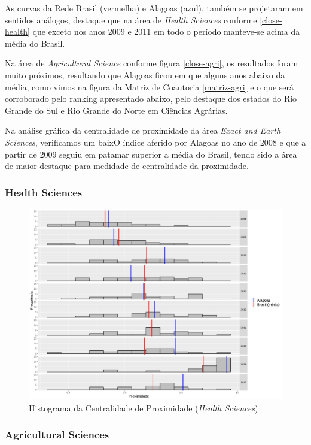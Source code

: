 As curvas da Rede Brasil (vermelha) e Alagoas (azul), também se projetaram em sentidos análogos, destaque que na área de \textit{Health Sciences} conforme \ref{close-health} que exceto nos anos 2009 e 2011 em todo o período manteve-se acima da média do Brasil. 

Na área de \textit{Agricultural Science} conforme figura \ref{close-agri}, os resultados foram muito próximos, resultando que Alagoas ficou em que alguns anos abaixo da média, como vimos na figura da Matriz de Coautoria \ref{matriz-agri} e o que será corroborado pelo ranking apresentado abaixo, pelo destaque dos estados do Rio Grande do Sul e Rio Grande do Norte em Ciências Agrárias.

Na análise gráfica da centralidade de proximidade da área \textit{Exact and Earth Sciences}, verificamos um baixO índice aferido por Alagoas no ano de 2008 e que a partir de 2009 seguiu em patamar superior a média do Brasil, tendo sido a área de maior destaque para medidade de centralidade da proximidade.


\subsubsection{Health Sciences}

\begin{figure}[H]
	\centering
	\includegraphics[scale=0.5]{Imagens/closeness-hist.pdf}
	\caption{Histograma da Centralidade de Proximidade (\textit{Health Sciences})}
	\label{hist-health-close}
\end{figure}

\subsubsection{Agricultural Sciences}

